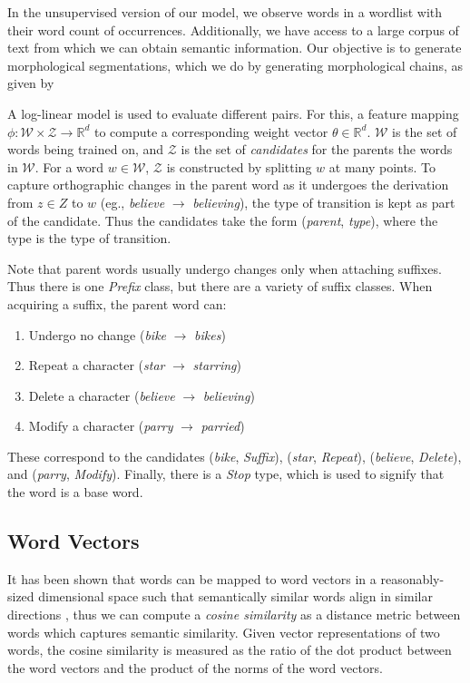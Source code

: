 \documentclass[11pt,twocolumn]{article}
\begin{document}
In the unsupervised version of our model, we observe words in a wordlist with their word count of occurrences. Additionally, we have access to a large corpus of text from which we can obtain semantic information. Our objective is to generate morphological segmentations, which we do by generating morphological chains, as given by \citeauthor{Narasimhan15}

A log-linear model is used to evaluate different pairs. For this, a feature mapping $\phi: \mathcal W \times \mathcal Z \rightarrow \mathbb R^d$ to compute a corresponding weight vector $\theta\in\mathbb R^d$. $\mathcal W$ is the set of words being trained on, and $\mathcal Z$ is the set of \emph{candidates} for the parents the words in $\mathcal W$. For a word $w\in\mathcal W$, $\mathcal Z$ is constructed by splitting $w$ at many points. To capture orthographic changes in the parent word as it undergoes the derivation from $z\in Z$ to $w$ (eg., \emph{believe} $\rightarrow$ \emph{believing}), the type of transition is kept as part of the candidate. Thus the candidates take the form (\emph{parent}, \emph{type}), where the type is the type of transition.

Note that parent words usually undergo changes only when attaching suffixes. Thus there is one \emph{Prefix} class, but there are a variety of suffix classes. When acquiring a suffix, the parent word can:
\begin{enumerate}[label=(\arabic*)]
    \item Undergo no change (\emph{bike} $\rightarrow$ \emph{bikes})
    \item Repeat a character (\emph{star} $\rightarrow$ \emph{starring})
    \item Delete a character (\emph{believe} $\rightarrow$ \emph{believing})
    \item Modify a character (\emph{parry} $\rightarrow$ \emph{parried})
\end{enumerate}

These correspond to the candidates (\emph{bike}, \emph{Suffix}), (\emph{star}, \emph{Repeat}), (\emph{believe}, \emph{Delete}), and (\emph{parry}, \emph{Modify}). Finally, there is a \emph{Stop} type, which is used to signify that the word is a base word.

\subsection{Word Vectors}

It has been shown that words can be mapped to word vectors in a reasonably-sized dimensional space such that semantically similar words align in similar directions \citep{Mikolov13}, thus we can compute a \emph{cosine similarity} as a distance metric between words which captures semantic similarity. Given vector representations of two words, the cosine similarity is measured as the ratio of the dot product between the word vectors and the product of the norms of the word vectors.
\end{document}
